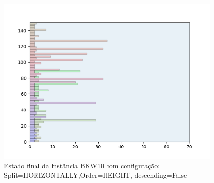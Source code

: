 \begin{figure}[H]
    \centering
    \caption[]{Estado final da instância BKW10 com configuração: Split=HORIZONTALLY,Order=HEIGHT, descending=False}
    \label{fig:bkw10-horizontally-height-false}
    \includegraphics[scale=0.5]{output/figures/bkw/bkw10/horizontally/height/false/000}
\end{figure}